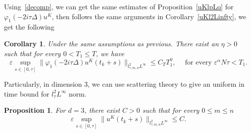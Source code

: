 \documentclass[10pt,a4paper]{article}
\newtheorem{corollary}[theorem]{Corollary}
\newtheorem{proposition}[theorem]{Proposition}
\begin{document}
  Using~\eqref{decomp}, we can get the same estimates of Proposition~\ref{uKlpLq} 
  for \(\varphi_1(-2i\tau\Delta)u^K\), then follows the same arguments in
  Corollary~\ref{uKl2Linfty}, we get the following

  \begin{corollary}\label{phiuKlpLq}
    Under the same assumptions as previous. There exist
    an \(\eta>0\) such that for every \(0< T_1 \leq T\), we have 
    \[ \varepsilon \sup_{s\in[0,\tau]} \|\varphi_1(-2i\tau\Delta)u^K(t_k+s)\|_{l^2_{\tau,m,n}L^\infty} 
    \leq C_T T_1^\eta, \quad \text{ for every } \varepsilon^\alpha N \tau < T_1. \]
  \end{corollary}

  Particularly, in dimension 3, we can use scattering theory to give an uniform
  in time bound for \(l^2_\tau L^\infty\) norm. 

  \begin{proposition}\label{uKl2Linftyd3}
    For \(d=3\), there exist \(C>0\) such that for every \(0\leq m\leq n\)
    \[ \varepsilon \sup_{s\in[0,\tau]} \|u^K(t_k+s)\|_{l^2_{\tau,m,n}L^\infty} 
    \leq C. \]
  \end{proposition}
\end{document}
